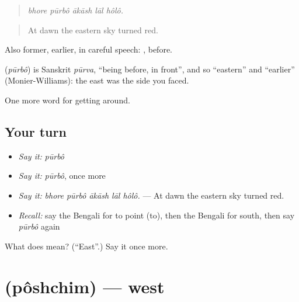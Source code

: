 \begin{quote}
    
\end{quote}

\begin{quote}
\emph{bhore pūrbô ākāsh lāl hôlô.}
\end{quote}

\begin{quote}
At dawn the eastern sky turned red.
\end{quote}

Also former, earlier, in careful speech: , before.

\begin{cousinweb}
\textbf{} (\emph{pūrbô}) is Sanskrit \emph{pūrva}, \textquotedblleft{}being before, in front\textquotedblright{}, and so \textquotedblleft{}eastern\textquotedblright{} and \textquotedblleft{}earlier\textquotedblright{} (Monier-Williams): the east was the side you faced.
\end{cousinweb}

\begin{grammarlens}[title={What you've built}]
One more word for getting around.
\end{grammarlens}

\subsection*{Your turn}
\begin{itemize}
\raggedright
  \item \emph{Say it:} \emph{pūrbô}
  \item \emph{Say it:} \emph{pūrbô}, once more
  \item \emph{Say it:} \emph{bhore pūrbô ākāsh lāl hôlô.} — At dawn the eastern sky turned red.
  \item \emph{Recall:} say the Bengali for to point (to), then the Bengali for south, then say \emph{pūrbô} again
\end{itemize}

\begin{tcolorbox}[breakable,colback=teal!4,colframe=teal!35!black,title={Before you move on}]
What does  mean? (\textquotedblleft{}East\textquotedblright{}.) Say it once more.
\end{tcolorbox}
\section[\texorpdfstring{\bn{পশ্চিম} (pôshchim)}{পশ্চিম (pôshchim)}]{ (pôshchim) — west}

